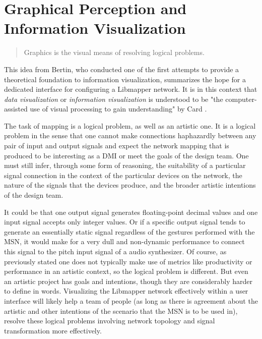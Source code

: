 \section{Graphical Perception and Information Visualization}

\begin{quote}
Graphics is the visual means of resolving logical problems. \cite{bertin1981}
\end{quote}

This idea from Bertin, who conducted one of the first attempts to provide a theoretical foundation to information visualization, summarizes the hope for a dedicated interface for configuring a Libmapper network. It is in this context that \emph{data visualization} or \emph{information visualization} is understood to be "the computer-assisted use of visual processing to gain understanding" by Card \cite{card1997}. 

The task of mapping is a logical problem, as well as an artistic one. It is a logical problem in the sense that one cannot make connections haphazardly between any pair of input and output signals and expect the network mapping that is produced to be interesting as a DMI or meet the goals of the design team. One must still infer, through some form of reasoning, the suitability of a particular signal connection in the context of the particular devices on the network, the nature of the signals that the devices produce, and the broader artistic intentions of the design team. 

It could be that one output signal generates floating-point decimal values and one input signal accepts only integer values. Or if a specific output signal tends to generate an essentially static signal regardless of the gestures performed with the MSN, it would make for a very dull and non-dynamic performance to connect this signal to the pitch input signal of a audio synthesizer. Of course, as previously stated one does not typically make use of metrics like productivity or performance in an artistic context, so the logical problem is different. But even an artistic project has goals and intentions, though they are considerably harder to define in words. Visualizing the Libmapper network effectively within a user interface will likely help a team of people (as long as there is agreement about the artistic and other intentions of the scenario that the MSN is to be used in), resolve these logical problems involving network topology and signal transformation more effectively. 


